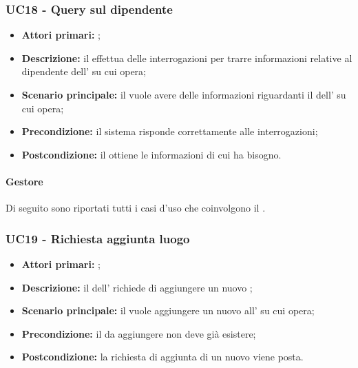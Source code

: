 \documentclass[casi-duso]{subfiles}
\begin{document}
\subsubsection{UC18 - Query sul dipendente}
\label{subsub:UC18}
\begin{itemize}
  \item \textbf{Attori primari:} ;
  \item \textbf{Descrizione:} il  effettua delle interrogazioni per trarre informazioni relative al dipendente dell' su cui opera;
  \item \textbf{Scenario principale:} il  vuole avere delle informazioni riguardanti il dell' su cui opera;
  \item \textbf{Precondizione:} il sistema risponde correttamente alle interrogazioni;
  \item \textbf{Postcondizione:} il  ottiene le informazioni di cui ha bisogno.
\end{itemize}

\paragraph{Gestore}
Di seguito sono riportati tutti i casi d'uso che coinvolgono il  .

\subsubsection{UC19 - Richiesta aggiunta luogo}
\label{subsub:UC19}
\begin{itemize}
  \item \textbf{Attori primari:} ;
  \item \textbf{Descrizione:} il  dell' richiede di aggiungere un nuovo ;
  \item \textbf{Scenario principale:} il  vuole aggiungere un nuovo  all' su cui opera;
  \item \textbf{Precondizione:} il  da aggiungere non deve già esistere;
  \item \textbf{Postcondizione:} la richiesta di aggiunta di un nuovo  viene posta.
\end{itemize}
\end{document}
